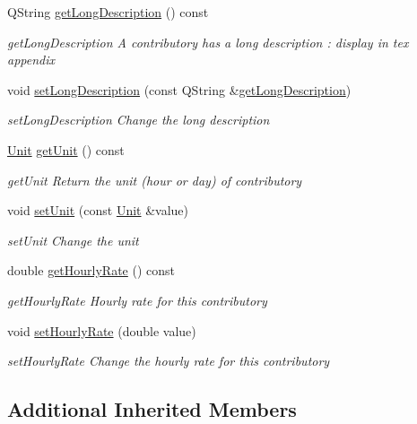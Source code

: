 \begin{DoxyCompactItemize}
Q\-String \hyperlink{classModels_1_1Contributory_abcd8dce3a913d558b73f17f16d5beb7a}{get\-Long\-Description} () const 
\begin{DoxyCompactList}\small\item\em get\-Long\-Description A contributory has a long description \-: display in tex appendix \end{DoxyCompactList}\item 
void \hyperlink{classModels_1_1Contributory_a40023cef80233eaa814d7bb41d668322}{set\-Long\-Description} (const Q\-String \&\hyperlink{classModels_1_1Contributory_abcd8dce3a913d558b73f17f16d5beb7a}{get\-Long\-Description})
\begin{DoxyCompactList}\small\item\em set\-Long\-Description Change the long description \end{DoxyCompactList}\item 
\hyperlink{classModels_1_1Unit}{Unit} \hyperlink{classModels_1_1Contributory_aa89a7587555a6ec768638e0c21d17450}{get\-Unit} () const 
\begin{DoxyCompactList}\small\item\em get\-Unit Return the unit (hour or day) of contributory \end{DoxyCompactList}\item 
void \hyperlink{classModels_1_1Contributory_a257273fe7acbd73c885d1c0fdddbb95e}{set\-Unit} (const \hyperlink{classModels_1_1Unit}{Unit} \&value)
\begin{DoxyCompactList}\small\item\em set\-Unit Change the unit \end{DoxyCompactList}\item 
double \hyperlink{classModels_1_1Contributory_aa6e1d43e7ca2e5e09bf6f1b65f577a0b}{get\-Hourly\-Rate} () const 
\begin{DoxyCompactList}\small\item\em get\-Hourly\-Rate Hourly rate for this contributory \end{DoxyCompactList}\item 
void \hyperlink{classModels_1_1Contributory_a08adb4281ec3a57c839290d01b1f41e5}{set\-Hourly\-Rate} (double value)
\begin{DoxyCompactList}\small\item\em set\-Hourly\-Rate Change the hourly rate for this contributory \end{DoxyCompactList}\end{DoxyCompactItemize}
\subsection*{Additional Inherited Members}


